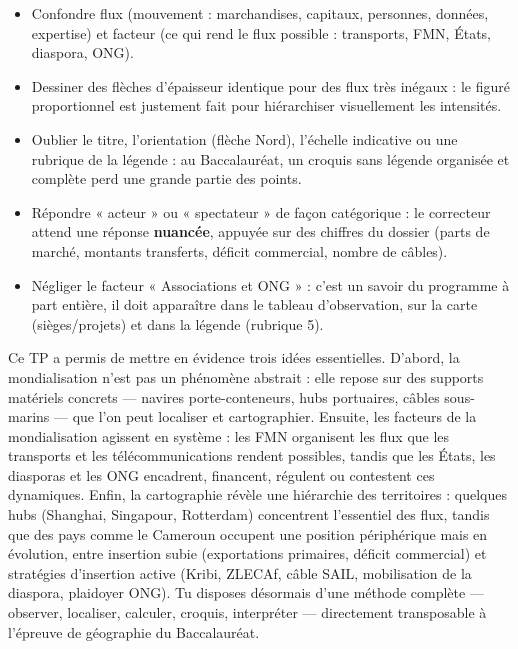 \documentclass[11pt]{article}
\newcommand{\cle}[1]{{\popxbold\color{popdark}#1}}
\newcounter{popsec}
\newcounter{popsub}
\newcommand{\courssub}[1]{%
  \stepcounter{popsub}%
  \par\vspace{9pt}\noindent{\popxbold\fontsize{11.5}{13}\selectfont\color{popink}{\color{poporange}\thepopsec.\thepopsub}\hspace{6pt}#1}\par\nopagebreak\vspace{4pt}
}
\begin{document}
\begin{attention}
\begin{itemize}
\item Confondre \cle{flux} (mouvement : marchandises, capitaux, personnes, données, expertise) et \cle{facteur} (ce qui rend le flux possible : transports, FMN, États, diaspora, ONG).
\item Dessiner des flèches d'épaisseur identique pour des flux très inégaux : le figuré proportionnel est justement fait pour hiérarchiser visuellement les intensités.
\item Oublier le titre, l'orientation (flèche Nord), l'échelle indicative ou une rubrique de la légende : au Baccalauréat, un croquis sans légende organisée et complète perd une grande partie des points.
\item Répondre « acteur » ou « spectateur » de façon catégorique : le correcteur attend une réponse \textbf{nuancée}, appuyée sur des chiffres du dossier (parts de marché, montants transferts, déficit commercial, nombre de câbles).
\item Négliger le facteur « Associations et ONG » : c'est un savoir du programme à part entière, il doit apparaître dans le tableau d'observation, sur la carte (sièges/projets) et dans la légende (rubrique 5).
\end{itemize}
\end{attention}

\courssub{Bilan de l'activité}

Ce TP a permis de mettre en évidence trois idées essentielles. D'abord, la mondialisation n'est pas un phénomène abstrait : elle repose sur des \cle{supports matériels} concrets — navires porte-conteneurs, hubs portuaires, câbles sous-marins — que l'on peut localiser et cartographier. Ensuite, les \cle{facteurs} de la mondialisation agissent en système : les FMN organisent les flux que les transports et les télécommunications rendent possibles, tandis que les États, les diasporas et les ONG encadrent, financent, régulent ou contestent ces dynamiques. Enfin, la cartographie révèle une \cle{hiérarchie des territoires} : quelques hubs (Shanghai, Singapour, Rotterdam) concentrent l'essentiel des flux, tandis que des pays comme le Cameroun occupent une position périphérique mais en évolution, entre insertion subie (exportations primaires, déficit commercial) et stratégies d'insertion active (Kribi, ZLECAf, câble SAIL, mobilisation de la diaspora, plaidoyer ONG). Tu disposes désormais d'une méthode complète — observer, localiser, calculer, croquis, interpréter — directement transposable à l'épreuve de géographie du Baccalauréat.
\end{document}
